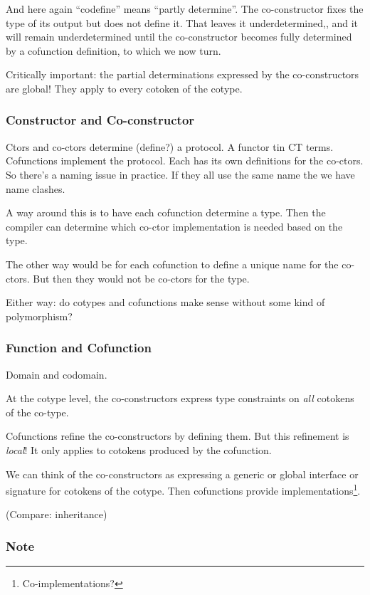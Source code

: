 \documentclass{article}
\begin{document}
And here again ``codefine'' means ``partly determine''. The
co-constructor fixes the type of its output but does not define it.
That leaves it underdetermined,, and it will remain underdetermined
until the co-constructor becomes fully determined by a cofunction
definition, to which we now turn.

Critically important: the partial determinations expressed by the
co-constructors are global! They apply to every cotoken of the cotype.

\subsubsection{Constructor and Co-constructor}

Ctors and co-ctors determine (define?) a protocol. A functor tin CT
terms. Cofunctions implement the protocol. Each has its own
definitions for the co-ctors. So there's a naming issue in practice.
If they all use the same name the we have name clashes.

A way around this is to have each cofunction determine a type. Then
the compiler can determine which co-ctor implementation is needed
based on the type.

The other way would be for each cofunction to define a unique name for
the co-ctors. But then they would not be co-ctors for the type.

Either way: do cotypes and cofunctions make sense without some kind of
polymorphism?

\subsubsection{Function and Cofunction}

Domain and codomain.

At the cotype level, the co-constructors express type constraints on
\textit{all} cotokens of the co-type.

Cofunctions refine the co-constructors by defining them. But this
refinement is \textit\textit{local}! It only applies to cotokens
produced by the cofunction.

We can think of the co-constructors as expressing a generic or global
interface or signature for cotokens of the cotype. Then cofunctions
provide implementations\footnote{Co-implementations?}.

(Compare: inheritance)

\subsubsection{Note}
\end{document}
